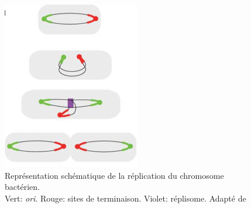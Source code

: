\begin{figure}[H]
	\begin{center}
		\includegraphics[scale=0.8]{./img/repl_simple.png}
	\end{center}
 \caption[Représentation schématique de la réplication du chromosome bactérien]{Représentation schématique de la réplication du chromosome bactérien. \\ Vert: \textit{ori}. Rouge: sites de terminaison. Violet: réplisome. Adapté de \citep{Ghosh2006}} \label{figRepl}
 \end{figure}
 
